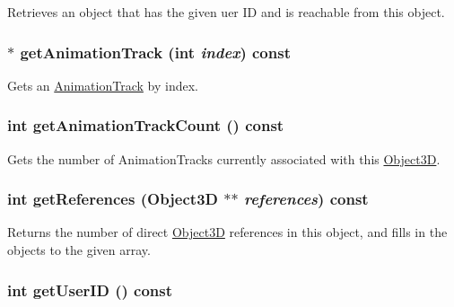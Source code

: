 Retrieves an object that has the given uer ID and is reachable from this object. \hypertarget{classm3g_1_1Object3D_f0978f3f2efe3227ca613da3361424dd}{
\subsubsection[{getAnimationTrack}]{ $\ast$ getAnimationTrack (int {\em index}) const}}
\label{classm3g_1_1Object3D_f0978f3f2efe3227ca613da3361424dd}


Gets an \hyperlink{classm3g_1_1AnimationTrack}{AnimationTrack} by index. \hypertarget{classm3g_1_1Object3D_0926843b66090795972850376b8e4e6c}{
\subsubsection[{getAnimationTrackCount}]{\setlength{\rightskip}{0pt plus 5cm}int getAnimationTrackCount () const}}
\label{classm3g_1_1Object3D_0926843b66090795972850376b8e4e6c}


Gets the number of AnimationTracks currently associated with this \hyperlink{classm3g_1_1Object3D}{Object3D}. \hypertarget{classm3g_1_1Object3D_d52d3c63076c4341b34c3631a17820e4}{
\subsubsection[{getReferences}]{\setlength{\rightskip}{0pt plus 5cm}int getReferences ({\bf Object3D} $\ast$$\ast$ {\em references}) const}}
\label{classm3g_1_1Object3D_d52d3c63076c4341b34c3631a17820e4}


Returns the number of direct \hyperlink{classm3g_1_1Object3D}{Object3D} references in this object, and fills in the objects to the given array. \hypertarget{classm3g_1_1Object3D_b8d9067364251d0208fcdc502d394e2c}{
\subsubsection[{getUserID}]{\setlength{\rightskip}{0pt plus 5cm}int getUserID () const}}
\label{classm3g_1_1Object3D_b8d9067364251d0208fcdc502d394e2c}


